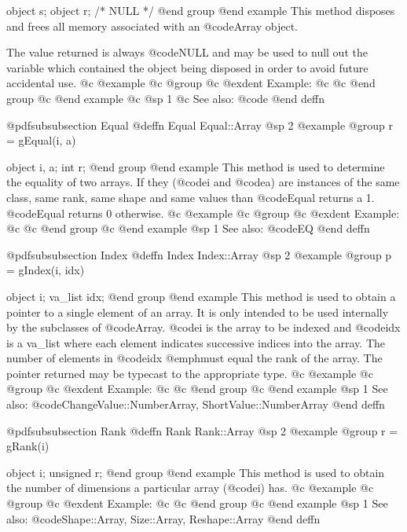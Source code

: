 object  s;
object  r;     /*  NULL  */
@end group
@end example
This method disposes and frees all memory associated with an @code{Array}
object.  

The value returned is always @code{NULL} and may be used to null out
the variable which contained the object being disposed in order to
avoid future accidental use.
@c @example
@c @group
@c @exdent Example:
@c 
@c @end group
@c @end example
@c @sp 1
@c See also:  @code{}
@end deffn





@pdfsubsubsection {Equal}
@deffn {Equal} Equal::Array
@sp 2
@example
@group
r = gEqual(i, a)

object  i, a;
int     r;
@end group
@end example
This method is used to determine the equality of two arrays.  If they
(@code{i} and @code{a}) are instances of the same class, same rank,
same shape and same values than @code{Equal} returns a 1.  @code{Equal}
returns 0 otherwise.
@c @example
@c @group
@c @exdent Example:
@c 
@c @end group
@c @end example
@sp 1
See also:  @code{EQ}
@end deffn








@pdfsubsubsection {Index}
@deffn {Index} Index::Array
@sp 2
@example
@group
p = gIndex(i, idx)

object     i;
va_list  idx;
@end group
@end example
This method is used to obtain a pointer to a single element of an array.
It is only intended to be used internally by the subclasses of
@code{Array}.  @code{i} is the array to be indexed and @code{idx} is a
va_list where each element indicates successive indices into the
array.  The number of elements in @code{idx} @emph{must} equal the rank
of the array.  The pointer returned may be typecast to the appropriate
type.
@c @example
@c @group
@c @exdent Example:
@c 
@c @end group
@c @end example
@sp 1
See also:  @code{ChangeValue::NumberArray, ShortValue::NumberArray}
@end deffn








@pdfsubsubsection {Rank}
@deffn {Rank} Rank::Array
@sp 2
@example
@group
r = gRank(i)

object    i;
unsigned  r;
@end group
@end example
This method is used to obtain the number of dimensions a particular
array (@code{i}) has.
@c @example
@c @group
@c @exdent Example:
@c 
@c @end group
@c @end example
@sp 1
See also:  @code{Shape::Array, Size::Array, Reshape::Array}
@end deffn











